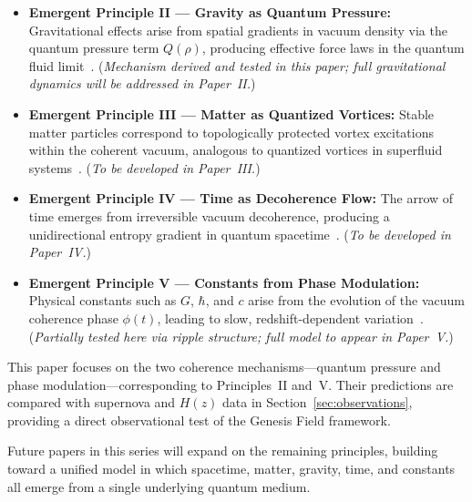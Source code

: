 \begin{itemize}[leftmargin=*]
    \item \textbf{Emergent Principle II — Gravity as Quantum Pressure:} Gravitational effects arise from spatial gradients in vacuum density via the quantum pressure term \( Q(\rho) \), producing effective force laws in the quantum fluid limit~\cite{volovik2003universe}. (\emph{Mechanism derived and tested in this paper; full gravitational dynamics will be addressed in Paper~II.})

    \item \textbf{Emergent Principle III — Matter as Quantized Vortices:} Stable matter particles correspond to topologically protected vortex excitations within the coherent vacuum, analogous to quantized vortices in superfluid systems~\cite{Fetter2009}. (\emph{To be developed in Paper~III.})

    \item \textbf{Emergent Principle IV — Time as Decoherence Flow:} The arrow of time emerges from irreversible vacuum decoherence, producing a unidirectional entropy gradient in quantum spacetime~\cite{Kiefer2009,Zeh2007}. (\emph{To be developed in Paper~IV.})

    \item \textbf{Emergent Principle V — Constants from Phase Modulation:} Physical constants such as \( G \), \( \hbar \), and \( c \) arise from the evolution of the vacuum coherence phase \( \phi(t) \), leading to slow, redshift-dependent variation~\cite{Uzan2011,Martins2017}. (\emph{Partially tested here via ripple structure; full model to appear in Paper~V.})
\end{itemize}

This paper focuses on the two coherence mechanisms—quantum pressure and phase modulation—corresponding to Principles~II and~V. Their predictions are compared with supernova and \( H(z) \) data in Section~\ref{sec:observations}, providing a direct observational test of the Genesis Field framework.

Future papers in this series will expand on the remaining principles, building toward a unified model in which spacetime, matter, gravity, time, and constants all emerge from a single underlying quantum medium.

